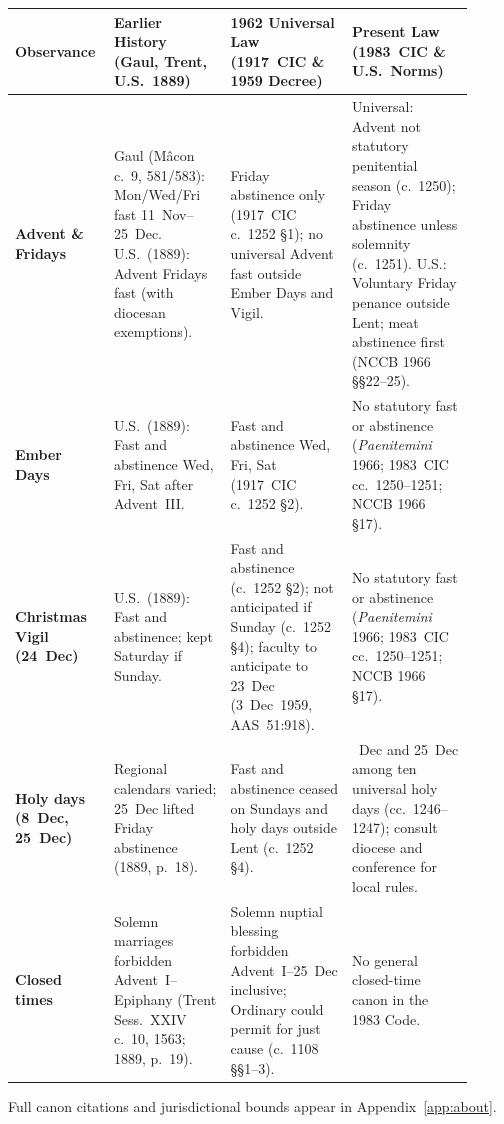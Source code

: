 \begin{longtable}{>{\raggedright\arraybackslash}p{0.17\linewidth}>{\raggedright\arraybackslash}p{0.24\linewidth}>{\raggedright\arraybackslash}p{0.25\linewidth}>{\raggedright\arraybackslash}p{0.25\linewidth}}
\toprule
\textbf{Observance} & \textbf{Earlier History (Gaul, Trent, U.S.~1889)} & \textbf{1962 Universal Law (1917~CIC \& 1959 Decree)} & \textbf{Present Law (1983~CIC \& U.S.~Norms)} \\
\midrule
\endhead
\textbf{Advent \& Fridays} & Gaul (M\^acon c.~9, 581/583): Mon/Wed/Fri fast 11~Nov--25~Dec. U.S.~(1889): Advent Fridays fast (with diocesan exemptions). & Friday abstinence only (1917~CIC c.~1252 \S 1); no universal Advent fast outside Ember Days and Vigil. & Universal: Advent not statutory penitential season (c.~1250); Friday abstinence unless solemnity (c.~1251). U.S.: Voluntary Friday penance outside Lent; meat abstinence first (NCCB 1966 \S\S 22--25). \\
\textbf{Ember Days} & U.S.~(1889): Fast and abstinence Wed, Fri, Sat after Advent~III. & Fast and abstinence Wed, Fri, Sat (1917~CIC c.~1252 \S 2). & No statutory fast or abstinence (\textit{Paenitemini} 1966; 1983~CIC cc.~1250--1251; NCCB 1966 \S 17). \\
\textbf{Christmas Vigil (24~Dec)} & U.S.~(1889): Fast and abstinence; kept Saturday if Sunday. & Fast and abstinence (c.~1252 \S 2); not anticipated if Sunday (c.~1252 \S 4); faculty to anticipate to 23~Dec (3~Dec~1959, AAS~51:918). & No statutory fast or abstinence (\textit{Paenitemini} 1966; 1983~CIC cc.~1250--1251; NCCB 1966 \S 17). \\
\textbf{Holy days (8~Dec, 25~Dec)} & Regional calendars varied; 25~Dec lifted Friday abstinence (1889, p.~18). & Fast and abstinence ceased on Sundays and holy days outside Lent (c.~1252 \S 4). & 8~Dec and 25~Dec among ten universal holy days (cc.~1246--1247); consult diocese and conference for local rules. \\
\textbf{Closed times} & Solemn marriages forbidden Advent~I--Epiphany (Trent Sess.~XXIV c.~10, 1563; 1889, p.~19). & Solemn nuptial blessing forbidden Advent~I--25~Dec inclusive; Ordinary could permit for just cause (c.~1108 \S\S 1--3). & No general closed-time canon in the 1983 Code. \\
\bottomrule
\end{longtable}

Full canon citations and jurisdictional bounds appear in Appendix~\ref{app:about}.

